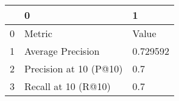 \begin{tabular}{lll}
\toprule
{} &                       0 &         1 \\
\midrule
0 &                  Metric &     Value \\
1 &       Average Precision &  0.729592 \\
2 &  Precision at 10 (P@10) &       0.7 \\
3 &     Recall at 10 (R@10) &       0.7 \\
\bottomrule
\end{tabular}
